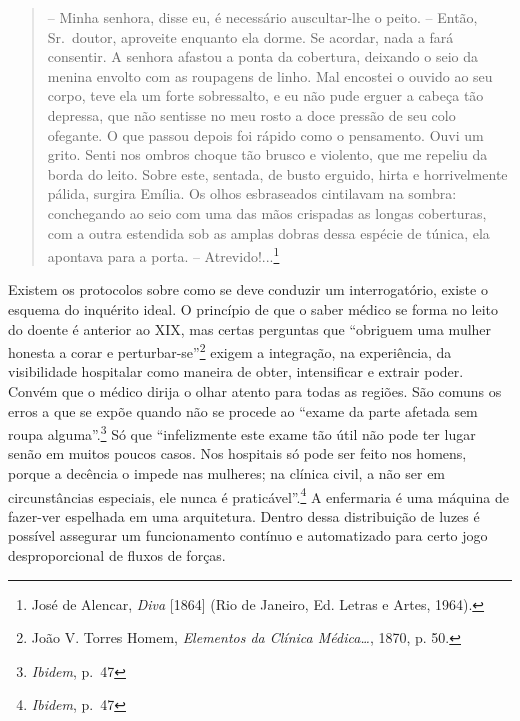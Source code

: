 \begin{quote}
-- Minha senhora, disse eu, é necessário auscultar-lhe o peito. --
Então, Sr.~doutor, aproveite enquanto ela dorme. Se acordar, nada a fará
consentir. A senhora afastou a ponta da cobertura, deixando o seio da
menina envolto com as roupagens de linho. Mal encostei o ouvido ao seu
corpo, teve ela um forte sobressalto, e eu não pude erguer a cabeça tão
depressa, que não sentisse no meu rosto a doce pressão de seu colo
ofegante. O que passou depois foi rápido como o pensamento. Ouvi um
grito. Senti nos ombros choque tão brusco e violento, que me repeliu da
borda do leito. Sobre este, sentada, de busto erguido, hirta e
horrivelmente pálida, surgira Emília. Os olhos esbraseados cintilavam na
sombra: conchegando ao seio com uma das mãos crispadas as longas
coberturas, com a outra estendida sob as amplas dobras dessa espécie de
túnica, ela apontava para a porta. -- Atrevido!...\footnote{José de
  Alencar, \emph{Diva} {[}1864{]} (Rio de Janeiro, Ed. Letras e Artes,
  1964).}
\end{quote}

Existem os protocolos sobre como se deve conduzir um interrogatório,
existe o esquema do inquérito ideal. O princípio de que o saber médico
se forma no leito do doente é anterior ao XIX, mas certas perguntas que
``obriguem uma mulher honesta a corar e perturbar-se''\footnote{João V.
  Torres Homem, \emph{Elementos da Clínica Médica\ldots{}}, 1870, p. 50.}
exigem a integração, na experiência, da visibilidade hospitalar como
maneira de obter, intensificar e extrair poder. Convém que o médico
dirija o olhar atento para todas as regiões. São comuns os erros a que
se expõe quando não se procede ao ``exame da parte afetada sem roupa
alguma''.\footnote{\emph{Ibidem}, p.~47} Só que ``infelizmente este
exame tão útil não pode ter lugar senão em muitos poucos casos. Nos
hospitais só pode ser feito nos homens, porque a decência o impede nas
mulheres; na clínica civil, a não ser em circunstâncias especiais, ele
nunca é praticável''.\footnote{\emph{Ibidem}, p.~47} A enfermaria é uma
máquina de fazer-ver espelhada em uma arquitetura. Dentro dessa
distribuição de luzes é possível assegurar um funcionamento contínuo e
automatizado para certo jogo desproporcional de fluxos de forças.

